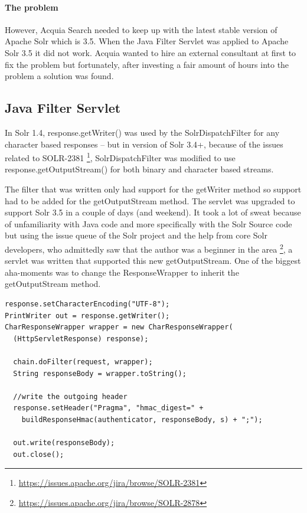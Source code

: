 \paragraph{The problem} However, Acquia Search needed to keep up with the latest stable version of Apache Solr which is 3.5. When the Java Filter Servlet was applied to Apache Solr 3.5 it did not work. 
Acquia wanted to hire an external consultant at first to fix the problem but fortunately, after investing a fair amount of hours into the problem a solution was found.

\subsection{Java Filter Servlet}
In Solr 1.4, response.getWriter() was used by the SolrDispatchFilter for any character based responses – but in version of Solr 3.4+, because of the issues related to SOLR-2381 \footnote{\url{https://issues.apache.org/jira/browse/SOLR-2381}}, SolrDispatchFilter was modified to use response.getOutputStream() for both binary and character based streams.

The filter that was written only had support for the getWriter method so support had to be added for the getOutputStream method. The servlet was upgraded to support Solr 3.5 in a couple of days (and weekend). It took a lot of sweat because of unfamiliarity with Java code and more specifically with the Solr Source code but using the issue queue of the Solr project and the help from core Solr developers, who admittedly saw that the author was a beginner in the area \footnote{\url{https://issues.apache.org/jira/browse/SOLR-2878}}, a servlet was written that supported this new getOutputStream. One of the biggest aha-moments was to change the ResponseWrapper to inherit the getOutputStream method. 
\begin{verbatim}
response.setCharacterEncoding("UTF-8");
PrintWriter out = response.getWriter();
CharResponseWrapper wrapper = new CharResponseWrapper(
  (HttpServletResponse) response);
 
  chain.doFilter(request, wrapper);
  String responseBody = wrapper.toString();
 
  //write the outgoing header
  response.setHeader("Pragma", "hmac_digest=" +
    buildResponseHmac(authenticator, responseBody, s) + ";");
 
  out.write(responseBody);
  out.close();
\end{verbatim}
\caption{A snippet of the original Acquia HMAC Filter for Solr 1.4.}

